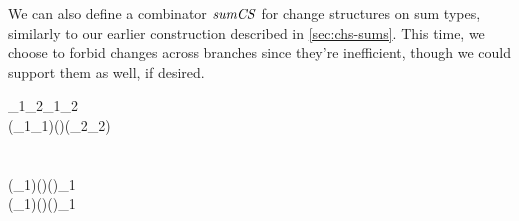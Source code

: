 We can also define a combinator \ensuremath{\Varid{sumCS}} for change structures on sum types,
similarly to our earlier construction described in \cref{sec:chs-sums}.
This time, we choose to forbid changes across branches since they're
inefficient, though we could support them as well, if desired.
\begin{hscode}\SaveRestoreHook
{}%
%
%
%
\>[B]{}\mathrel{:\mkern-1mu:}\;_{1}\;\;_{2}\to {}\;_{1}\;\;_{2}\to {}\<[E]%
\\
\>[B]{}\<[3]%
\>[3]{}\;(\;_{1}\;_{1})\;(\;\;)\;(\;_{2}\;_{2}){}\<[E]%
\\[\blanklineskip]%
\>[B]{}\;\;\mathrel{=}\;\<[E]%
\\
\>[B]{}\<[3]%
\>[3]{}\<[E]%
\\
\>[3]{}\<[5]%
\>[5]{}\;(\;_{1})\;(\;)\mathrel{=}\mathrel{\$}(\myboxplus)\;\;_{1}\;\<[E]%
\\
\>[3]{}\<[5]%
\>[5]{}\;(\;_{1})\;(\;)\mathrel{=}\mathrel{\$}(\myboxplus)\;\;_{1}\;\<[E]%
\\
\>[3]{}\<[5]%
\>[5]{}\;\text{\textunderscore}\;\text{\textunderscore}\mathrel{=}\;\<[E]%
\ColumnHook
\end{hscode}\resethooks

